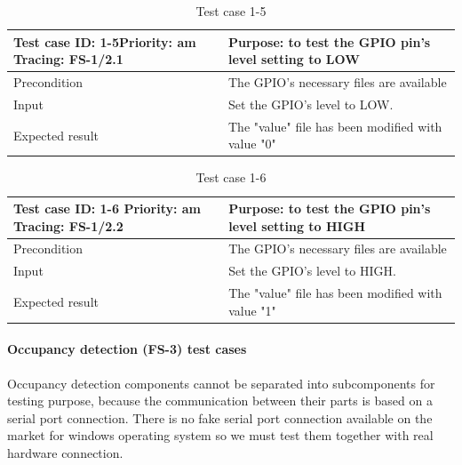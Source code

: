 \begin{table}[H]
	\caption{Test case 1-5}
	\label{table:TCase-FS1-5}
	\begin{center}
		\renewcommand{\arraystretch}{1.8}
		\begin{tabu} 
			to 0.9 \textwidth
			{  X[0.4, c] X[c] }
			\toprule
			Test case ID: 1-5\newline Priority: am \newline Tracing: FS-1/2.1 & Purpose: to test the GPIO pin's level setting to LOW \\ \midrule
			Precondition                                                      & The GPIO's necessary files are available             \\
			Input                                                             & Set the GPIO's level to LOW.                         \\
			Expected result                                                   & The "value" file has been modified with value "0"    \\ \bottomrule
		\end{tabu}
	\end{center}
\end{table} 

\begin{table}[H]
	\caption{Test case 1-6}
	\label{table:TCase-FS1-6}
	\begin{center}
		\renewcommand{\arraystretch}{1.8}
		\begin{tabu} 
			to 0.9 \textwidth
			{  X[0.4, c] X[c] }
			\toprule
			Test case ID: 1-6 \newline Priority: am \newline Tracing: FS-1/2.2 & Purpose: to test the GPIO pin's level setting to HIGH \\ \midrule
			Precondition                                                       & The GPIO's necessary files are available              \\
			Input                                                              & Set the GPIO's level to HIGH.                         \\
			Expected result                                                    & The "value" file has been modified with value "1"     \\ \bottomrule
		\end{tabu}
	\end{center}
\end{table} 

\paragraph{Occupancy detection (FS-3) test cases} Occupancy detection components cannot be separated into subcomponents for testing purpose, because the communication between their parts is based on a serial port connection. There is no fake serial port  connection  available on the market for windows operating system so we must test them together with real hardware connection.

